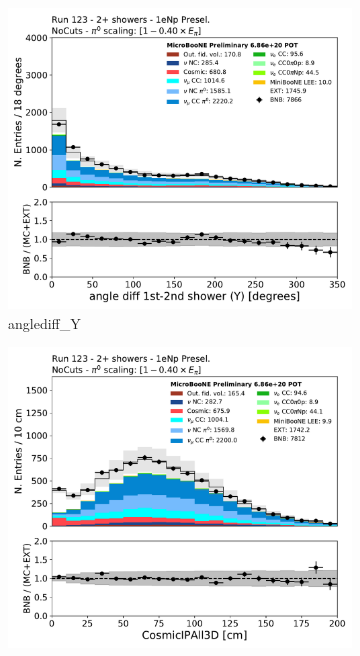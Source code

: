 \begin{figure}[H]
    \centering
    \begin{subfigure}{0.3\textwidth}
    \includegraphics[width=1.0\textwidth]{Sidebands/Figures/1eNp/TwoShower/TwoPShr_NP_None_pi0e040/anglediff_Y.pdf}
    \caption{anglediff\_Y}
    \end{subfigure}
    \begin{subfigure}{0.3\textwidth}
    \includegraphics[width=1.0\textwidth]{Sidebands/Figures/1eNp/TwoShower/TwoPShr_NP_None_pi0e040/CosmicIPAll3D.pdf}

\end{subfigure}
\end{figure}
